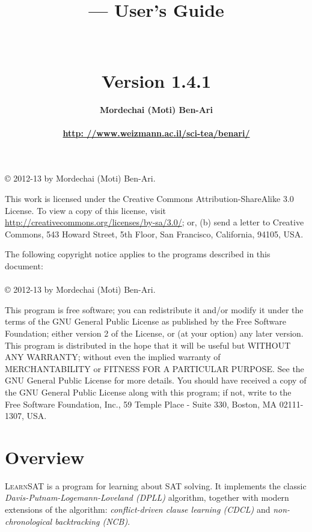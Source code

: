 \documentclass[11pt]{article}
\title{\bfseries \ls{} --- User's Guide\\\mbox{}\\\mbox{}\\
\bfseries\normalsize Version 1.4.1}
\author{\bfseries Mordechai (Moti) Ben-Ari\\\mbox{}\\
\url{http: //www.weizmann.ac.il/sci-tea/benari/}}
\newcommand*{\ls}{\textsc{LearnSAT}}
\begin{document}
\maketitle

\thispagestyle{empty}

\vspace*{\fill}

\begin{center}
\copyright{} 2012-13 by Mordechai (Moti) Ben-Ari.
\end{center}
This work is licensed under the Creative Commons Attribution-ShareAlike 3.0
License. To view a copy of this license, visit
\url{http://creativecommons.org/licenses/by-sa/3.0/}; or, (b) send a letter
to Creative Commons, 543 Howard Street, 5th Floor, San Francisco,
California, 94105, USA.

\bigskip\bigskip

 
\begin{center}
The following copyright notice applies to the programs described in this
document:\mbox{}\\\mbox{}\\
\copyright{} 2012-13 by Mordechai (Moti) Ben-Ari.
\end{center}

This program is free software; you can redistribute it and/or
modify it under the terms of the GNU General Public License
as published by the Free Software Foundation; either version 2
of the License, or (at your option) any later version.
This program is distributed in the hope that it will be useful
but WITHOUT ANY WARRANTY; without even the implied warranty of
MERCHANTABILITY or FITNESS FOR A PARTICULAR PURPOSE.
See the GNU General Public License for more details.
You should have received a copy of the GNU General Public License
along with this program; if not, write to the Free Software
Foundation, Inc., 59 Temple Place - Suite 330, Boston, MA
02111-1307, USA.

\setcounter{page}{0}
\newpage

\section{Overview}

\ls{} is a program for learning about SAT solving. It implements the
classic \emph{Davis-Putnam-Logemann-Loveland (DPLL)} algorithm, together
with modern extensions of the algorithm: \emph{conflict-driven clause
learning (CDCL)} and \emph{non-chronological backtracking (NCB)}.
\end{document}
